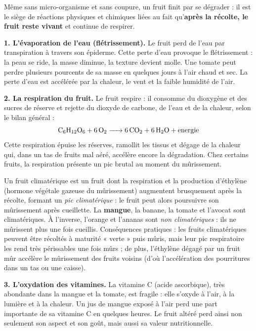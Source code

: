 \documentclass[11pt]{article}
\newcommand{\cle}[1]{{\popxbold\color{popdark}#1}}
\newcounter{popsec}
\newcounter{popsub}
\newcommand{\courssub}[1]{%
  \stepcounter{popsub}%
  \par\vspace{9pt}\noindent{\popxbold\fontsize{11.5}{13}\selectfont\color{popink}{\color{poporange}\thepopsec.\thepopsub}\hspace{6pt}#1}\par\nopagebreak\vspace{4pt}
}
\begin{document}
\courssub{Les altérations physico-chimiques}

Même sans micro-organisme et sans coupure, un fruit finit par se dégrader : il est le siège de réactions physiques et chimiques liées au fait qu'\textbf{après la récolte, le fruit reste vivant} et continue de respirer.

\textbf{1. L'évaporation de l'eau (flétrissement).} Le fruit perd de l'eau par transpiration à travers son épiderme. Cette perte d'eau provoque le \cle{flétrissement} : la peau se ride, la masse diminue, la texture devient molle. Une tomate peut perdre plusieurs pourcents de sa masse en quelques jours à l'air chaud et sec. La perte d'eau est accélérée par la chaleur, le vent et la faible humidité de l'air.

\textbf{2. La respiration du fruit.} Le fruit respire : il consomme du dioxygène et des sucres de réserve et rejette du dioxyde de carbone, de l'eau et de la chaleur, selon le bilan général :
\[ \ce{C6H12O6 + 6O2 -> 6CO2 + 6H2O + energie} \]
Cette respiration épuise les réserves, ramollit les tissus et dégage de la chaleur qui, dans un tas de fruits mal aéré, accélère encore la dégradation. Chez certains fruits, la respiration présente un pic brutal au moment du mûrissement.

\begin{definition}
Un \cle{fruit climatérique} est un fruit dont la respiration et la production d'\cle{éthylène} (hormone végétale gazeuse du mûrissement) augmentent brusquement après la récolte, formant un \emph{pic climatérique} : le fruit peut alors poursuivre son mûrissement après cueillette. La \textbf{mangue}, la banane, la tomate et l'avocat sont climatériques. À l'inverse, l'orange et l'ananas sont \emph{non climatériques} : ils ne mûrissent plus une fois cueillis. Conséquences pratiques : les fruits climatériques peuvent être récoltés à maturité « verte » puis mûris, mais leur pic respiratoire les rend très périssables une fois mûrs ; de plus, l'éthylène dégagé par un fruit mûr accélère le mûrissement des fruits voisins (d'où l'accélération des pourritures dans un tas ou une caisse).
\end{definition}

\textbf{3. L'oxydation des vitamines.} La vitamine C (acide ascorbique), très abondante dans la mangue et la tomate, est fragile : elle s'oxyde à l'air, à la lumière et à la chaleur. Un jus de mangue exposé à l'air perd une part importante de sa vitamine C en quelques heures. Le fruit altéré perd ainsi non seulement son aspect et son goût, mais aussi sa \cle{valeur nutritionnelle}.
\end{document}

